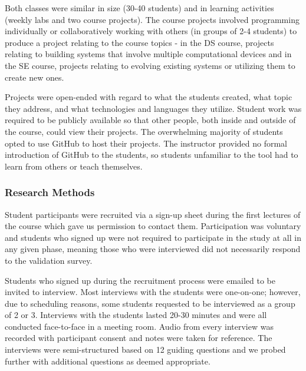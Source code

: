 Both classes were similar in size (30-40 students) and in learning activities (weekly labs and two course projects). The course projects involved programming individually or collaboratively working with others (in groups of 2-4 students) to produce a project relating to the course topics - in the DS course, projects relating to building systems that involve multiple computational devices and in the SE course, projects relating to evolving existing systems or utilizing them to create new ones.

Projects were open-ended with regard to what the students created, what topic they address, and what technologies and languages they utilize. Student work was required to be publicly available so that other people, both inside and outside of the course, could view their projects. The overwhelming majority of students opted to use GitHub to host their projects. The instructor provided no formal introduction of GitHub to the students, so students unfamiliar to the tool had to learn from others or teach themselves. %

\subsubsection{Research Methods}
Student participants were recruited via a sign-up sheet during the first lectures of the course which gave us permission to contact them. Participation was voluntary and students who signed up were not required to participate in the study at all in any given phase, meaning those who were interviewed did not necessarily respond to the validation survey.

Students who signed up during the recruitment process were emailed to be invited to interview. Most interviews with the students were one-on-one; however, due to scheduling reasons, some students requested to be interviewed as a group of 2 or 3. Interviews with the students lasted 20-30 minutes and were all conducted face-to-face in a meeting room. Audio from every interview was recorded with participant consent and notes were taken for reference. The interviews were semi-structured based on 12 guiding questions and we probed further with additional questions as deemed appropriate. %

